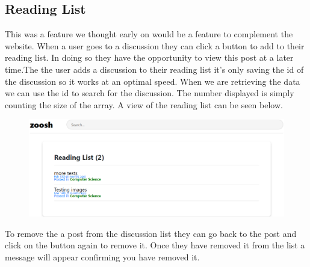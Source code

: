 \subsection{Reading List}
This was a feature we thought early on would be a feature to complement the website. When a user goes to a discussion they can click a button to add to their reading list. In doing so they have the opportunity to view this post at a later time.The the user adds a discussion to their reading list it's only saving the id of the discussion so it works at an optimal speed. When we are retrieving the data we can use the id to search for the discussion. The number displayed is simply counting the size of the array. A view of the reading list can be seen below.
\begin{figure}[H]
  \centering
  \includegraphics[scale=0.55]{img/ReadingList.PNG}
  \label{fig:Readinglist}
\end{figure}
To remove the a post from the discussion list they can go back to the post and click on the button again to remove it. Once they have removed it from the list a message will appear confirming you have removed it.

